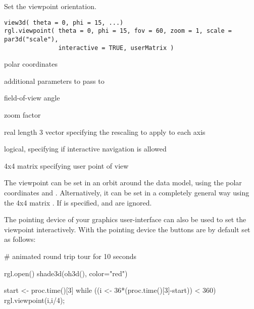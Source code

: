 \begin{Description}\relax
Set the viewpoint orientation.
\end{Description}
\begin{Usage}
\begin{verbatim}
view3d( theta = 0, phi = 15, ...)
rgl.viewpoint( theta = 0, phi = 15, fov = 60, zoom = 1, scale = par3d("scale"), 
               interactive = TRUE, userMatrix )
\end{verbatim}
\end{Usage}
\begin{Arguments}
\begin{ldescription}
\item[\code{theta,phi}] polar coordinates
\item[\code{...}] additional parameters to pass to 
\item[\code{fov}] field-of-view angle
\item[\code{zoom}] zoom factor
\item[\code{scale}] real length 3 vector specifying the rescaling to apply to each axis
\item[\code{interactive}] logical, specifying if interactive navigation is allowed
\item[\code{userMatrix}] 4x4 matrix specifying user point of view
\end{ldescription}
\end{Arguments}
\begin{Details}\relax
The viewpoint can be set in an orbit around the data model, using the polar coordinates \code{\\theta}
and .  Alternatively, it can be set in a completely general way using the 4x4 matrix
.  If  is specified,  and  are ignored.

The pointing device of your graphics user-interface can also be used to 
set the viewpoint interactively. With the pointing device the buttons are by default set as follows:

\end{Details}
\begin{SeeAlso}\relax
{}
\end{SeeAlso}
\begin{Examples}
\begin{ExampleCode}

# animated round trip tour for 10 seconds

rgl.open()
shade3d(oh3d(), color="red")

start <- proc.time()[3]
while ((i <- 36*(proc.time()[3]-start)) < 360) {
  rgl.viewpoint(i,i/4); 
}

\end{ExampleCode}
\end{Examples}

